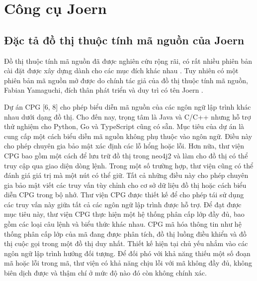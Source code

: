 \section{Công cụ Joern}

\subsection{Đặc tả đồ thị thuộc tính mã nguồn của Joern}

Đồ thị thuộc tính mã nguồn đã được nghiên cứu rộng rãi, có rất nhiều phiên bản cài đặt được xây dựng dành cho các mục đích khác nhau \cite{yamaguchi2014modeling, xiaomeng2018cpgva, kuchler2022representing, githubGitHubWimkeirgraft, githubGitHubPlumeossplume, joernJoernHunteraposs, fraunhoferaisecHomeCode, banse2021cloud, weiss2022language, keirsgieter2020graft}.
Tuy nhiên có một phiên bản mã nguồn mở được do chính tác giả của đồ thị thuộc tính mã nguồn, Fabian Yamaguchi, đích thân phát triển và duy trì có tên Joern \cite{joernJoernHunteraposs}.

Dự án CPG [6, 8] cho phép biểu diễn mã nguồn của các ngôn ngữ lập trình khác nhau dưới dạng đồ thị.
Cho đến nay, trọng tâm là Java và C/C++ nhưng hỗ trợ thử nghiệm cho Python, Go và TypeScript cũng có sẵn.
Mục tiêu của dự án là cung cấp một cách biểu diễn mã nguồn không phụ thuộc vào ngôn ngữ.
Điều này cho phép chuyên gia bảo mật xác định các lỗ hổng hoặc lỗi.
Hơn nữa, thư viện CPG bao gồm một cách để lưu trữ đồ thị trong neo4j2 và làm cho đồ thị có thể truy cập qua giao diện dòng lệnh.
Trong một số trường hợp, thư viện cũng có thể đánh giá giá trị mà một nút có thể giữ.
Tất cả những điều này cho phép chuyên gia bảo mật viết các truy vấn tùy chỉnh cho cơ sở dữ liệu đồ thị hoặc cách biểu diễn CPG trong bộ nhớ.
Thư viện CPG được thiết kế để cho phép tái sử dụng các truy vấn này giữa tất cả các ngôn ngữ lập trình được hỗ trợ.
Để đạt được mục tiêu này, thư viện CPG thực hiện một hệ thống phân cấp lớp đầy đủ, bao gồm các loại câu lệnh và biểu thức khác nhau.
CPG mã hóa thông tin như hệ thống phân cấp lớp của mã đang được phân tích, đồ thị luồng điều khiển và đồ thị cuộc gọi trong một đồ thị duy nhất.
Thiết kế hiện tại chủ yếu nhắm vào các ngôn ngữ lập trình hướng đối tượng.
Để đối phó với khả năng thiếu một số đoạn mã hoặc lỗi trong mã, thư viện có khả năng chịu lỗi với mã không đầy đủ, không biên dịch được và thậm chí ở mức độ nào đó còn không chính xác.


